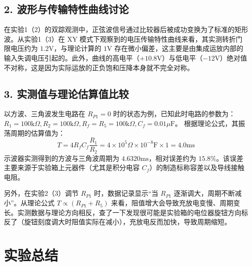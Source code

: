 ﻿\documentclass[10.5pt]{config}
\begin{document}
\subsection*{2. 波形与传输特性曲线讨论}
在实验1（2）的双踪观测中，正弦波信号通过比较器后被成功变换为了标准的矩形波。从实验1（3）在 XY 模式下观察到的电压传输特性曲线来看，其实测转折门限电压约为 $1.2\text{V}$，与理论计算的 $1\text{V}$ 存在微小偏差，这主要是由集成运放内部的输入失调电压引起的。此外，曲线的高电平（$+10.8\text{V}$）与低电平（$-12\text{V}$）绝对值不对称，这是因为实际运放的正负饱和压降本身就不完全对称。

\subsection*{3. 实测值与理论估算值比较}
以方波、三角波发生电路在 $R_{P1}=0$ 时的状态为例，已知此时电路的参数为：$R_1=100\text{k}\Omega, R_2=100\text{k}\Omega, R_f = R_5 = 100\text{k}\Omega, C_f = 0.01\mu\text{F}$。
根据理论公式，其振荡周期的估算值为：
\begin{equation*}
    T = 4R_f C_f \frac{R_1}{R_2} = 4 \times 10^5\Omega \times 10^{-8}\text{F} \times 1 = 4.0\text{ms}
\end{equation*}
示波器实测得到的方波与三角波周期为 $4.6320\text{ms}$，相对误差约为 $15.8\%$。该误差主要来源于实验箱上元器件（尤其是积分电容 $C_f$）的制造标称容差以及导线接触电阻。

另外，在实验2（3）调节 $R_{P1}$ 时，数据记录显示“当 $R_{P1}$ 逐渐调大，周期不断减小”。从理论公式 $T \propto (R_{P1}+R_5)$ 来看，阻值增大会导致充放电变慢、周期变长。实测数据与理论方向相反，查了一下发现很可能是实验箱的电位器旋钮方向标反了（旋钮刻度调大时阻值实际在减小），充放电反而加快，导致周期缩短。


\section{实验总结}
\end{document}
